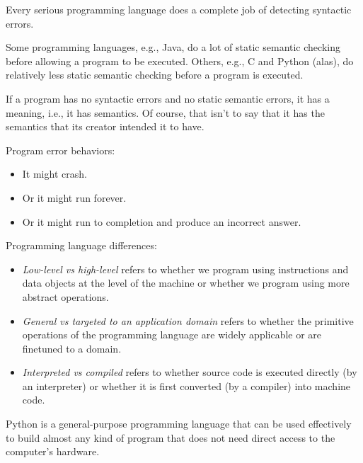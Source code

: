 \documentclass[10pt,a5paper]{article}
\begin{document}
Every serious programming language does a complete job of detecting syntactic errors.

Some programming languages, e.g., Java, do a lot of static semantic checking before allowing a program to be executed. Others, e.g., C and Python (alas), do relatively less static semantic checking before a program is executed.

If a program has no syntactic errors and no static semantic errors, it has a meaning, i.e., it has semantics. Of course, that isn’t to say that it has the semantics that its creator intended it to have.

Program error behaviors:
\begin{itemize}

	\item It might crash.
	
	\item Or it might run forever.
	
	\item Or it might run to completion and produce an incorrect answer.
	
\end{itemize}

Programming language differences:
\begin{itemize}

	\item \textit{Low-level vs high-level} refers to whether we program using instructions and data objects at the level of the machine or whether we program using more abstract operations.
	
	\item \textit{General vs targeted to an application domain} refers to whether the primitive operations of the programming language are widely applicable or are finetuned to a domain. 
	
	\item \textit{Interpreted vs compiled} refers to whether source code is executed directly (by an interpreter) or whether it is first converted (by a compiler) into machine code.
	
\end{itemize}

Python is a general-purpose programming language that can be used effectively to build almost any kind of program that does not need direct access to the computer’s hardware.
\end{document}
